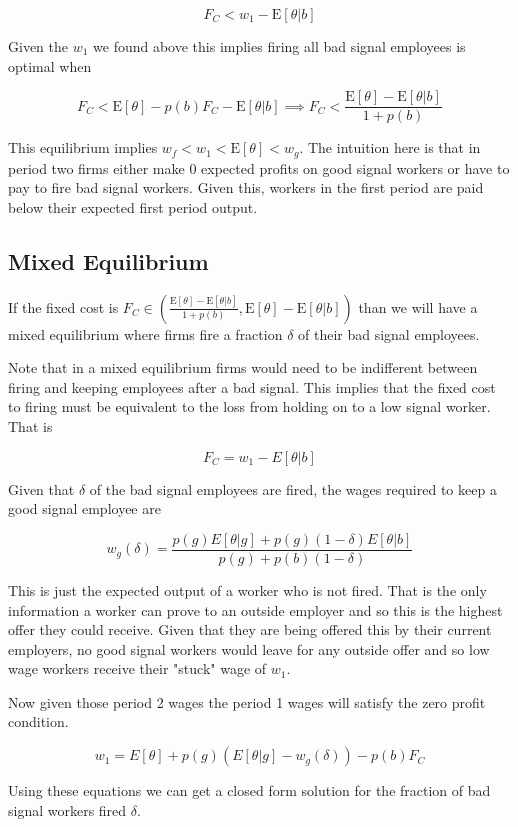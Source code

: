 \documentclass[11pt]{article}
\newcommand{\E}{\mathrm{E}}
\begin{document}
$$ F_C <  w_1 - \E[\theta|b] $$

Given the $w_1$ we found above this implies firing all bad signal employees is optimal when 

$$F_C <\E[\theta] - p(b) F_C - \E[\theta |b] \implies F_C < \frac{\E[\theta] - \E[\theta|b]}{1+p(b)}$$

This equilibrium implies $w_f < w_1 < \E[\theta] < w_g$. The intuition here is that in period two firms either make 0 expected profits on good signal workers or have to pay to fire bad signal workers. Given this, workers in the first period are paid below their expected first period output. 
 
\subsection{Mixed Equilibrium}

If the fixed cost is $F_C \in \left( \frac{\E[\theta] - \E[\theta|b]}{1+p(b)}, \E[\theta] - \E[\theta |b] \right)$ than we will have a mixed equilibrium where firms fire a fraction $\delta$ of their bad signal employees.\par 

Note that in a mixed equilibrium firms would need to be indifferent between firing and keeping employees after a bad signal. This implies that the fixed cost to firing must be equivalent to the loss from holding on to a low signal worker. That is 

$$ F_C = w_1 - E[\theta|b]$$

Given that $\delta$ of the bad signal employees are fired, the wages required to keep a good signal employee are 

$$ w_g(\delta) = \frac{p(g) E[\theta|g] + p(g) (1-\delta) E[\theta|b] }{ p(g) +p(b)(1-\delta) } $$

This is just the expected output of a worker who is not fired. That is the only information a worker can prove to an outside employer and so this is the highest offer they could receive. Given that they are being offered this by their current employers, no good signal workers would leave for any outside offer and so low wage workers receive their "stuck" wage of $w_1$. \par 

Now given those period 2 wages the period 1 wages will satisfy the zero profit condition. 

$$ w_1 = E[\theta] + p(g) \left( E[\theta | g]  - w_g(\delta) \right) - p(b) F_C$$

Using these equations we can get a closed form solution for the fraction of bad signal workers fired $\delta$. 
\end{document}
